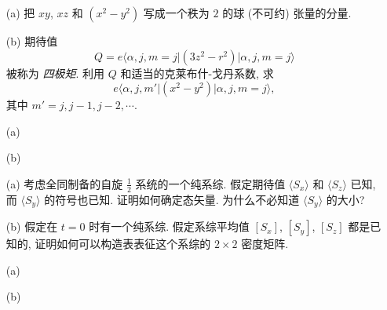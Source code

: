 \documentclass{assignment}
\begin{document}
\begin{prob}[课本习题 3.32]
    \begin{itemize}
        \item[(a)] 把 $xy$, $xz$ 和 $(x^2-y^2)$ 写成一个秩为 $2$ 的球 (不可约) 张量的分量.
        \item[(b)] 期待值
        \[
            Q=e\langle\alpha,j,m=j\rvert(3z^2-r^2)\lvert\alpha,j,m=j\rangle
        \]
        被称为 \textit{四极矩}. 利用 $Q$ 和适当的克莱布什-戈丹系数, 求
        \[
            e\langle\alpha,j,m'\rvert(x^2-y^2)\lvert\alpha,j,m=j\rangle,
        \]
        其中 $m'=j,j-1,j-2,\cdots$.
    \end{itemize}
\end{prob}
\begin{sol}
    \begin{itemize}
        \item[(a)] 
        \item[(b)] 
    \end{itemize}
\end{sol}

\begin{prob}[课本习题 3.10]
    \begin{itemize}
        \item[(a)] 考虑全同制备的自旋 $\frac{1}{2}$ 系统的一个纯系综. 假定期待值 $\langle S_x\rangle$ 和 $\langle S_z\rangle$ 已知, 而 $\langle S_y\rangle$ 的符号也已知. 证明如何确定态矢量. 为什么不必知道 $\langle S_y\rangle$ 的大小?
        \item[(b)] 假定在 $t=0$ 时有一个纯系综. 假定系综平均值 $[S_x]$, $[S_y]$, $[S_z]$ 都是已知的, 证明如何可以构造表表征这个系综的 $2\times 2$ 密度矩阵.
    \end{itemize}
\end{prob}
\begin{pf}
    \begin{itemize}
        \item[(a)] 
        \item[(b)] 
    \end{itemize}
\end{pf}
\end{document}
